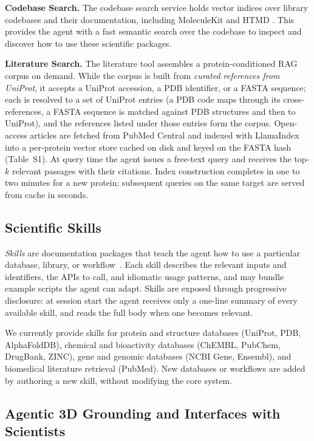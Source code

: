 \documentclass[journal=jcisd8,manuscript=article]{achemso}
\begin{document}
\noindent\textbf{Codebase Search.} The codebase search service holds vector indices over library codebases and their documentation, including MoleculeKit and HTMD \citep{Doerr2016}. This provides the agent with a fast semantic search over the codebase to inspect and discover how to use these scientific packages.

\noindent\textbf{Literature Search.}\label{sec:data:literature} The literature tool assembles a protein-conditioned RAG corpus on demand. While the corpus is built from \emph{curated references from UniProt}, it accepts a UniProt accession, a PDB identifier, or a FASTA sequence; each is resolved to a set of UniProt entries (a PDB code maps through its cross-references, a FASTA sequence is matched against PDB structures and then to UniProt), and the references listed under those entries form the corpus. Open-access articles are fetched from PubMed Central and indexed with LlamaIndex~\citep{Liu_LlamaIndex_2022} into a per-protein vector store cached on disk and keyed on the FASTA hash (Table~S1). At query time the agent issues a free-text query and receives the top-$k$ relevant passages with their citations. Index construction completes in one to two minutes for a new protein; subsequent queries on the same target are served from cache in seconds.


\subsection{Scientific Skills}\label{sec:skills}

\emph{Skills} are documentation packages that teach the agent how to use a particular database, library, or workflow~\citep{anthropic_skills_2025}. Each skill describes the relevant inputs and identifiers, the APIs to call, and idiomatic usage patterns, and may bundle example scripts the agent can adapt. Skills are exposed through progressive disclosure: at session start the agent receives only a one-line summary of every available skill, and reads the full body when one becomes relevant.

We currently provide skills for protein and structure databases (UniProt, PDB, AlphaFoldDB), chemical and bioactivity databases (ChEMBL, PubChem, DrugBank, ZINC), gene and genomic databases (NCBI Gene, Ensembl), and biomedical literature retrieval (PubMed). New databases or workflows are added by authoring a new skill, without modifying the core system.



\subsection{Agentic 3D Grounding and Interfaces with Scientists}\label{subsec:viewer}
\end{document}
